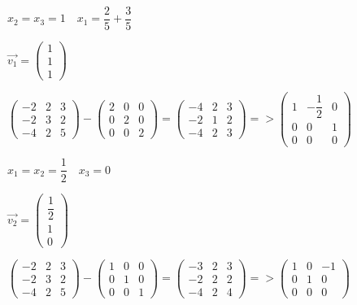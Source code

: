 \documentclass[12pt,letterpaper]{article}
\begin{document}
\begin{enumerate}[label=(\alph*)]
        $x_2 = x_3 = 1\quad x_1=\dfrac{2}{5}+\dfrac{3}{5}$
        
        $\vec{v_1} = \begin{pmatrix}
            1\\
            1\\
            1
        \end{pmatrix}$
        
        $\begin{pmatrix}
            -2 & 2 & 3 \\
            -2 & 3 & 2 \\
            -4 & 2 & 5
        \end{pmatrix} - \begin{pmatrix}
            2 & 0 & 0 \\
            0 & 2 & 0 \\
            0 & 0 & 2
        \end{pmatrix} = \begin{pmatrix}
            -4 & 2 & 3 \\
            -2 & 1 & 2 \\
            -4 & 2 & 3
        \end{pmatrix} => \begin{pmatrix}
            1 & -\dfrac{1}{2} & 0 \\
            0 & 0 & 1 \\
            0 & 0 & 0
        \end{pmatrix}$
        
        $x_1 = x_2 = \dfrac{1}{2}\quad x_3=0$
        
        $\vec{v_2} = \begin{pmatrix}
            \dfrac{1}{2}\\
            1\\
            0
        \end{pmatrix}$
        
        $\begin{pmatrix}
            -2 & 2 & 3 \\
            -2 & 3 & 2 \\
            -4 & 2 & 5
        \end{pmatrix} - \begin{pmatrix}
            1 & 0 & 0 \\
            0 & 1 & 0 \\
            0 & 0 & 1
        \end{pmatrix} = \begin{pmatrix}
            -3 & 2 & 3 \\
            -2 & 2 & 2 \\
            -4 & 2 & 4
        \end{pmatrix} => \begin{pmatrix}
            1 & 0 & -1 \\
            0 & 1 & 0 \\
            0 & 0 & 0
        \end{pmatrix}$
        

\end{enumerate}
\end{document}
